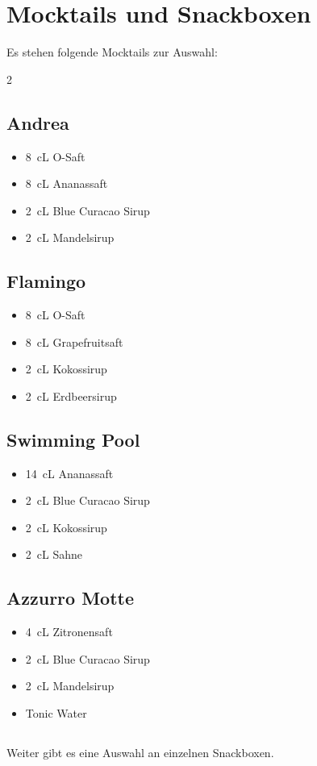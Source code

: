 \documentclass[11pt]{scrartcl}
\begin{document}
\section{Mocktails und Snackboxen}
Es stehen folgende Mocktails zur Auswahl:
\begin{multicols}{2}
    \subsection*{Andrea}
\begin{itemize}
    \item \qty{8}{\centi\liter} O-Saft
    \item \qty{8}{\centi\liter} Ananassaft
    \item \qty{2}{\centi\liter} Blue Curacao Sirup
    \item \qty{2}{\centi\liter} Mandelsirup
\end{itemize}
\subsection*{Flamingo}
\begin{itemize}
    \item \qty{8}{\centi\liter} O-Saft
    \item \qty{8}{\centi\liter} Grapefruitsaft
    \item \qty{2}{\centi\liter} Kokossirup
    \item \qty{2}{\centi\liter} Erdbeersirup
\end{itemize}
\subsection*{Swimming Pool}
\begin{itemize}
    \item \qty{14}{\centi\liter} Ananassaft
    \item \qty{2}{\centi\liter} Blue Curacao Sirup
    \item \qty{2}{\centi\liter} Kokossirup
    \item \qty{2}{\centi\liter} Sahne
\end{itemize}
\subsection*{Azzurro Motte}
\begin{itemize}
    \item \qty{4}{\centi\liter} Zitronensaft
    \item \qty{2}{\centi\liter} Blue Curacao Sirup
    \item \qty{2}{\centi\liter} Mandelsirup
    \item Tonic Water
\end{itemize}
\end{multicols}\subsection*{}
Weiter gibt es eine Auswahl an einzelnen Snackboxen.
\end{document}
